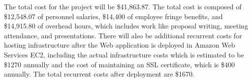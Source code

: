
The total cost for the project will be \$41,863.87. The total cost is composed
of \$12,548.07 of personnel salaries, \$14,400 of employee fringe benefits, and
\$14,915.80 of overhead hours, which includes work like proposal writing,
meeting attendance, and presentations. There will also be additional recurrent
costs for hosting infrastructure after the Web application is deployed in
Amazon Web Services EC2, including the actual infrastructure costs which is
estimated to be \$1270 annually and the cost of maintaining an SSL certificate,
which is \$400 annually. The total recurrent costs after deployment are \$1670.
